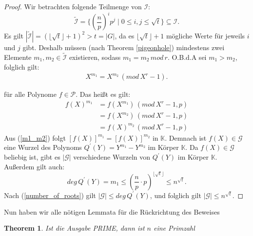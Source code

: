 \documentclass[12pt,oneside]{article}
\newtheorem{theorem}{Theorem}[section]
\theoremstyle{remark}
\theoremstyle{definition}
\begin{document}
\begin{proof}
Wir betrachten folgende Teilmenge von $\mathcal{I}$:
\begin{equation}
    \widetilde{\mathcal{I}} = \{ (\frac{n}{p})^i p^j \mid 0 \leq i,j \leq \sqrt{t}\} \subseteq \mathcal{I}.
\end{equation}
Es gilt $|\widetilde{\mathcal{I}}| = (\lfloor \sqrt{t} \rfloor + 1)^2 > t = |G|$, da es $ \lfloor \sqrt{t} \rfloor + 1$  mögliche Werte für jeweils $i$ und $j$ gibt. Deshalb müssen (nach Theorem \ref{pigeonhole}) mindestens zwei Elemente $m_1,m_2 \in \widetilde{\mathcal{I}}$ existieren, sodass $m_1 = m_2 \, mod \, r$. O.B.d.A sei $m_1 > m_2 $, folglich gilt:\newline
\begin{align*}
    X^{m_1} = X^{m_2} \, (mod \, X^r - 1).
\end{align*}

für alle Polynome $ f \in \mathcal{P}$. Das heißt es gilt:\newline
\begin{equation}\label{m1_m2}
    \begin{aligned}
         f(X)^{m_1} &= f(X^{m_1}) \, (mod \, X^r - 1, p) \\
        &= f(X^{m_2}) \, (mod \, X^r - 1,p) \\
        &= f(X)^{m_2} \, (mod \, X^r - 1,p)
    \end{aligned}
\end{equation}
Aus (\ref{m1_m2}) folgt $[f(X)]^{m_1} = [f(X)]^{m_2}$ in $\mathbb{K}$. Demnach ist $f(X) \in  \mathcal{G}$ eine Wurzel des Polynoms $Q^{'}(Y) = Y^{m_1} - Y^{m_2}$ im Körper $\mathbb{K}$. Da $f(X) \in \mathcal{G} $ beliebig ist, gibt es $|\mathcal{G}|$ verschiedene Wurzeln von $Q^{'}(Y)$ im Körper $\mathbb{K}$. Außerdem gilt auch:
\begin{equation}\label{degQ}
    deg \, Q^{'}(Y) = m_1 \leq (\frac{n}{p} \cdot p)^{\lfloor \sqrt{t} \rfloor} \leq n^{\sqrt{t}}. 
\end{equation}
Nach (\ref{number_of_roots}) gilt $|\mathcal{G}| \leq deg \, Q^{'}(Y)$, und folglich gilt $|\mathcal{G}| \leq n^{\sqrt{t}}$.\newline\newline
\end{proof}

Nun haben wir alle nötigen Lemmata für die Rückrichtung des Beweises

\begin{theorem}\label{rueck_rich}
Ist die Ausgabe PRIME, dann ist $n$ eine Primzahl 
\end{theorem}
\end{document}

